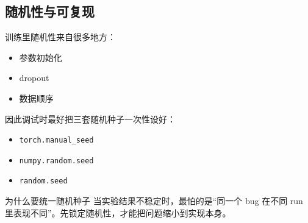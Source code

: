\subsection{随机性与可复现}

训练里随机性来自很多地方：
\begin{itemize}
    \item 参数初始化
    \item dropout
    \item 数据顺序
\end{itemize}

因此调试时最好把三套随机种子一次性设好：
\begin{itemize}
    \item \texttt{torch.manual\_seed}
    \item \texttt{numpy.random.seed}
    \item \texttt{random.seed}
\end{itemize}

\begin{importantbox}{为什么要统一随机种子}
当实验结果不稳定时，最怕的是“同一个 bug 在不同 run 里表现不同”。先锁定随机性，才能把问题缩小到实现本身。
\end{importantbox}

